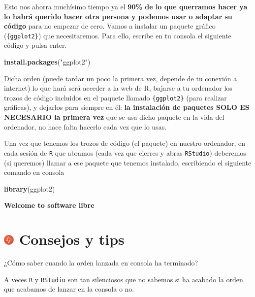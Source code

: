 \documentclass[11pt,]{book}
\newenvironment{Shaded}{\begin{snugshade}}{\end{snugshade}}
\newcommand{\KeywordTok}[1]{\textcolor[rgb]{0.27,0.27,0.27}{\textbf{#1}}}
\newcommand{\NormalTok}[1]{#1}
\newcommand{\StringTok}[1]{\textcolor[rgb]{0.5,0.5,0.5}{#1}}
\begin{document}
Esto nos ahorra muchísimo tiempo ya el \textbf{90\% de lo que querramos hacer ya lo habrá querido hacer otra persona y podemos usar o adaptar su código} para no empezar de cero. Vamos a instalar un paquete gráfico (\texttt{\{ggplot2\}}) que necesitaremos. Para ello, escribe en tu consola el siguiente código y pulsa enter.

\begin{Shaded}
\begin{Highlighting}[]
\KeywordTok{install.packages}\NormalTok{(}\StringTok{"ggplot2"}\NormalTok{)}
\end{Highlighting}
\end{Shaded}

Dicha orden (puede tardar un poco la primera vez, depende de tu conexión a internet) lo que hará será acceder a la web de R, bajarse a tu ordenador los trozos de código incluidos en el paquete llamado \texttt{\{ggplot2\}} (para realizar gráficas), y dejarlos para siempre en él: \textbf{la instalación de paquetes SOLO ES NECESARIO la primera vez} que se usa dicho paquete en la vida del ordenador, no hace falta hacerlo cada vez que lo usas.

Una vez que tenemos los trozos de código (el paquete) en nuestro ordenador, en cada sesión de \texttt{R} que abramos (cada vez que cierres y abras \texttt{RStudio}) deberemos (si queremos) llamar a ese paquete que tenemos instalado, escribiendo el siguiente comando en consola

\begin{Shaded}
\begin{Highlighting}[]
\KeywordTok{library}\NormalTok{(ggplot2)}
\end{Highlighting}
\end{Shaded}

\textbf{Welcome to software libre}

\hypertarget{consejos-y-tips}{%
\section[ Consejos y tips]{\texorpdfstring{\protect\includegraphics[width=0.04\textwidth,height=\textheight]{img/logo_info.png} Consejos y tips}{ Consejos y tips}}\label{consejos-y-tips}}

¿Cómo saber cuando la orden lanzada en consola ha terminado?

A veces \texttt{R} y \texttt{RStudio} son tan silenciosos que no sabemos si ha acabado la orden que acabamos de lanzar en la consola o no.
\end{document}
